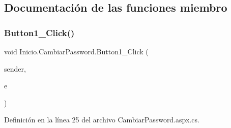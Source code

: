 \subsection{Documentación de las funciones miembro}
\mbox{\label{classInicio_1_1CambiarPassword_a59bb43a3c0865c4c403c30cf49bc5381}} 
\subsubsection{\texorpdfstring{Button1\_Click()}{Button1\_Click()}}
{\footnotesize\ttfamily void Inicio.\+Cambiar\+Password.\+Button1\+\_\+\+Click (\begin{DoxyParamCaption}\item[{object}]{sender,  }\item[{Event\+Args}]{e }\end{DoxyParamCaption})\hspace{0.3cm}{\ttfamily [protected]}}



Definición en la línea 25 del archivo Cambiar\+Password.\+aspx.\+cs.


